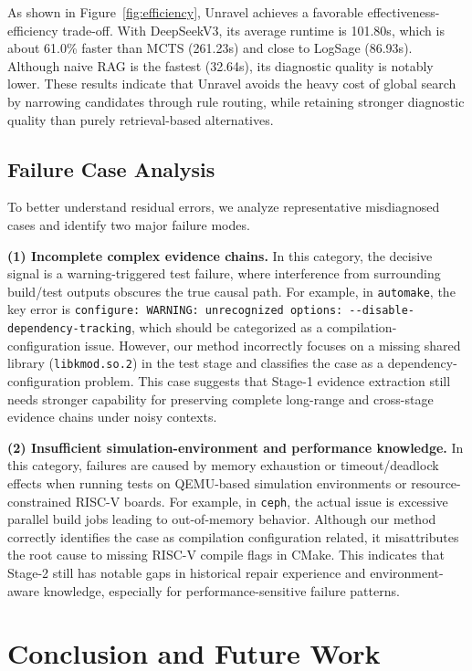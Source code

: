 \documentclass[sigconf,anonymous]{acmart}
\begin{document}
As shown in Figure~\ref{fig:efficiency}, Unravel achieves a favorable effectiveness-efficiency trade-off. With DeepSeekV3, its average runtime is 101.80s, which is about 61.0\% faster than MCTS (261.23s) and close to LogSage (86.93s). Although naive RAG is the fastest (32.64s), its diagnostic quality is notably lower. These results indicate that Unravel avoids the heavy cost of global search by narrowing candidates through rule routing, while retaining stronger diagnostic quality than purely retrieval-based alternatives.

\subsection{Failure Case Analysis}

To better understand residual errors, we analyze representative misdiagnosed cases and identify two major failure modes.

\textbf{(1) Incomplete complex evidence chains.} In this category, the decisive signal is a warning-triggered test failure, where interference from surrounding build/test outputs obscures the true causal path. For example, in \texttt{automake}, the key error is \nolinkurl{configure: WARNING: unrecognized options: --disable-dependency-tracking}, which should be categorized as a compilation-configuration issue. However, our method incorrectly focuses on a missing shared library (\texttt{libkmod.so.2}) in the test stage and classifies the case as a dependency-configuration problem. This case suggests that Stage-1 evidence extraction still needs stronger capability for preserving complete long-range and cross-stage evidence chains under noisy contexts.

\textbf{(2) Insufficient simulation-environment and performance knowledge.} In this category, failures are caused by memory exhaustion or timeout/deadlock effects when running tests on QEMU-based simulation environments or resource-constrained RISC-V boards. For example, in \texttt{ceph}, the actual issue is excessive parallel build jobs leading to out-of-memory behavior. Although our method correctly identifies the case as compilation configuration related, it misattributes the root cause to missing RISC-V compile flags in CMake. This indicates that Stage-2 still has notable gaps in historical repair experience and environment-aware knowledge, especially for performance-sensitive failure patterns.

\section{Conclusion and Future Work}
\end{document}
